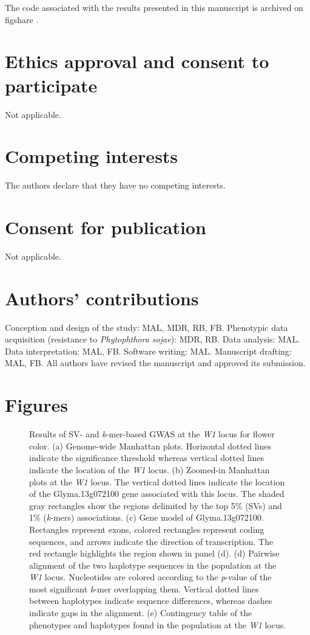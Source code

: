 \documentclass{article}
\begin{document}
The code associated with the results presented in this manuscript is archived
on figshare \citep{kmer-gwas-code}.

\section*{Ethics approval and consent to participate}%
Not applicable.

\section*{Competing interests}
The authors declare that they have no competing interests.

\section*{Consent for publication}%
Not applicable.

\section*{Authors' contributions}
Conception and design of the study: MAL, MDR, RB, FB.
Phenotypic data acquisition (resistance to \textit{Phytophthora sojae}): MDR, RB.
Data analysis: MAL.
Data interpretation: MAL, FB.
Software writing: MAL.
Manuscript drafting: MAL, FB.
All authors have revised the manuscript and approved its submission.




\section*{Figures}

\begin{figure}[p]
	\caption{Results of SV- and \textit{k}-mer-based GWAS at the
	\textit{W1} locus for flower color. (a) Genome-wide Manhattan plots.
	Horizontal dotted lines indicate the significance
	threshold whereas vertical dotted lines indicate the location of the
	\textit{W1} locus. (b) Zoomed-in Manhattan plots at the \textit{W1} locus.
	The vertical dotted lines indicate the location of the
	Glyma.13g072100 gene associated with this locus. The shaded gray
	rectangles show the regions delimited by the top 5\% (SVs) and
	1\% (\textit{k}-mers) associations.  (c) Gene model of Glyma.13g072100.
	Rectangles represent exons, colored rectangles represent coding
	sequences, and arrows indicate the direction of transcription. The red
	rectangle highlights the region shown in panel (d). (d) Pairwise
	alignment of the two haplotype sequences in the population at the
	\textit{W1} locus. Nucleotides are
	colored according to the \textit{p}-value of the most significant
	\textit{k}-mer overlapping them. Vertical dotted lines between haplotypes
	indicate sequence differences, whereas dashes indicate gaps in the
	alignment. (e) Contingency table of the phenotypes and haplotypes found
	in the population at the \textit{W1} locus.}
	\label{flower-color-main-figure}
\end{figure}
\end{document}
